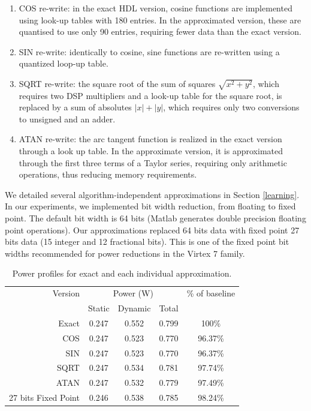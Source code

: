 \begin{enumerate}
\item COS re-write: in the exact HDL version, cosine functions are implemented using look-up tables with 180 entries. In the approximated version, these are quantised to use only 90 entries, requiring fewer data than the exact version.
\item SIN re-write: identically to cosine, sine functions are re-written using a quantized loop-up table.
\item SQRT re-write: the square root of the sum of squares $\sqrt{x^2+y^2}$, which requires two DSP multipliers and a look-up table for the square root, is replaced by a sum of absolutes $\left| x\right|+\left| y\right|$, which requires only two conversions to unsigned and an adder.
\item ATAN re-write: the arc tangent function is realized in the exact version through a look up table. In the approximate version, it is approximated through the first three terms of a Taylor series, requiring only arithmetic operations, thus reducing memory requirements.
\end{enumerate}

\par We detailed several algorithm-independent approximations in Section \ref{learning}. In our experiments, we implemented bit width reduction, from floating to fixed point. The default bit width is 64 bits (Matlab generates double precision floating point operations). Our approximations replaced 64 bits data with fixed point 27 bits data (15 integer and 12 fractional bits). This is one of the fixed point bit widths recommended for power reductions in the Virtex 7 family. 

\begin{table}[h]
\begin{tabular}{r c c c c}
\toprule
Version & \multicolumn{3}{c}{Power (W)} & \% of baseline\\
 & Static & Dynamic & Total &\\
\hline
Exact & 0.247 & 0.552 & 0.799 & 100\%\\
COS & 0.247 & 0.523 & 0.770 & 96.37\%\\
SIN & 0.247 & 0.523 & 0.770 & 96.37\%\\
SQRT & 0.247 & 0.534 & 0.781 & 97.74\%\\
ATAN & 0.247 & 0.532 & 0.779 & 97.49\%\\
27 bits Fixed Point & 0.246 & 0.538 & 0.785 & 98.24\%\\
\hline
\end{tabular}
\caption{Power profiles for exact and each individual approximation.}
\label{table:power_profiles}
\end{table}


